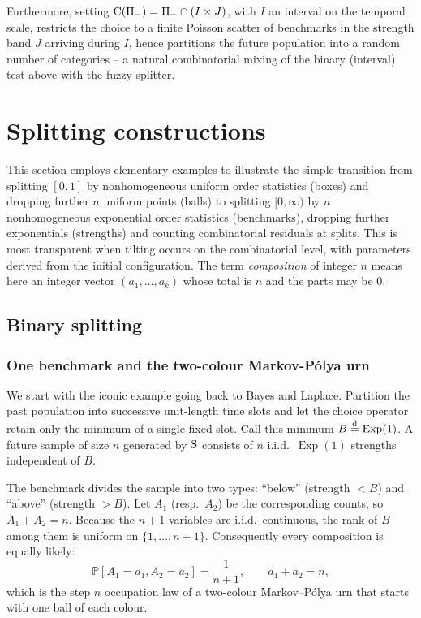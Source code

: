 \documentclass[11pt]{article}
\newcommand{\PP}{\mathbb{P}}
\DeclareMathOperator{\Exp}{Exp}
\theoremstyle{plain}
\theoremstyle{definition}
\begin{document}
Furthermore, setting \({\rm C}(\Pi_-)=\Pi_-\cap(I\times J)\), with \(I\) an interval on the temporal scale, restricts the choice to a finite Poisson scatter of benchmarks in the strength band \(J\) arriving during \(I\), hence partitions the future population into a random number of categories -- a natural combinatorial mixing of the binary (interval) test above with the fuzzy splitter.
 

\section{Splitting constructions}
This section employs elementary examples to illustrate the simple transition from splitting $[0,1]$ by nonhomogeneous uniform order statistics (boxes) and dropping further $n$ uniform points (balls) to splitting
$[0,\infty)$ by $n$ nonhomogeneous exponential order statistics (benchmarks), dropping further exponentials (strengths) and counting combinatorial residuals at splits. 
This is most transparent when tilting occurs on the combinatorial level, with parameters derived from the initial configuration.
The term {\it composition} of integer $n$ means here an integer vector $(a_1,\ldots,a_k)$ whose total is $n$ and the parts may be $0$.


\subsection{Binary splitting}
\subsubsection{One benchmark and the two-colour Markov-P\'olya urn}

\label{sec:one-benchmark}
We start with the iconic example going back to Bayes and Laplace.
Partition the past population into successive unit-length time slots and let the choice operator retain only the minimum of a single fixed slot. Call this minimum \(B\stackrel{\rm d}{=}\Exp(1)\). A future sample of size \(n\) generated by \({\rm S}\) consists of \(n\) i.i.d.\ \(\Exp(1)\) strengths independent of \(B\).
 
The benchmark divides the sample into two types: ``below'' (strength \(<B\)) and ``above'' (strength \(>B\)). Let \(A_1\) (resp.\ \(A_2\)) be the corresponding counts, so \(A_1+A_2=n\). Because the \(n+1\) variables are i.i.d.\ continuous, the rank of \(B\) among them is uniform on \(\{1,\dots,n+1\}\). Consequently every composition is equally likely:
\begin{equation}
\label{eq:uniform}
\PP[A_1=a_1,A_2=a_2]=\frac1{n+1},\qquad a_1+a_2=n,
\end{equation}
which is 
the step $n$ occupation law of a two-colour Markov--P\'olya urn that starts with one ball of each colour.
 
\end{document}
